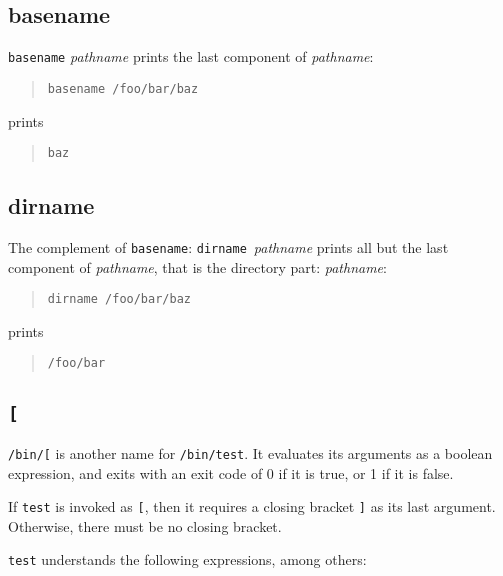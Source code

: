 \documentclass{article}
\newcommand{\code}[1]{\texttt{#1}}
\begin{document}
\subsection{basename}

	\code{basename} \textit{pathname} prints the last component of
\textit{pathname}:
\begin{quote}
\begin{verbatim}
basename /foo/bar/baz
\end{verbatim}
\end{quote}
prints
\begin{quote}
\begin{verbatim}
baz
\end{verbatim}
\end{quote}

\subsection{dirname}

	The complement of \code{basename}:
\code{dirname}~\textit{pathname} prints all but the last component of
\textit{pathname}, that is the directory part:
\textit{pathname}:
\begin{quote}
\begin{verbatim}
dirname /foo/bar/baz
\end{verbatim}
\end{quote}
prints
\begin{quote}
\begin{verbatim}
/foo/bar
\end{verbatim}
\end{quote}

\subsection{\code{[}}

	\label{test} \code{/bin/[} is another name for
\code{/bin/test}. It evaluates its arguments as a boolean expression,
and exits with an exit code of 0 if it is true, or 1 if it is false.

	If \code{test} is invoked as \code{[}, then it requires a
closing bracket \code{]} as its last argument. Otherwise, there must
be no closing bracket.

	\code{test} understands the following expressions, among
others:
\end{document}
